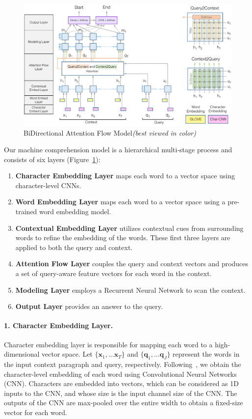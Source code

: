 
\begin{figure}[t]
\centering
\includegraphics[width=34pc]{figures/model}
\caption{\small BiDirectional Attention Flow Model\space\space \textit{(best viewed in color)}}
\label{fig:model}
\end{figure}
Our machine comprehension model is a hierarchical multi-stage process and consists of six layers (Figure~\ref{fig:model}): 
\begin{enumerate}
    \item \textbf{Character Embedding Layer} maps each word to a vector space using character-level CNNs. %
    \item \textbf{Word Embedding Layer} maps each word to a vector space using a pre-trained word embedding model. %
    \item \textbf{Contextual Embedding Layer} utilizes contextual cues from surrounding words to refine the embedding of the words. %
    These first three layers are applied to both the query and context.
    \item \textbf{Attention Flow Layer} %
    couples the query and context vectors and produces a set of query-aware feature vectors for each word in the context.
    \item \textbf{Modeling Layer} employs a Recurrent Neural Network to scan the context.%
    \item \textbf{Output Layer} provides an answer to the query.%
\end{enumerate}

\paragraph{1. Character Embedding Layer.}\label{subsec:char}
Character embedding layer is responsible for mapping each word to a high-dimensional vector space. Let $\{\bm{x}_1, \dots \bm{x}_T\}$ and $\{\bm{q}_1, \dots \bm{q}_J\}$ represent the words in the input context paragraph and query, respectively.
Following~\cite{char-cnn}, we obtain the character-level embedding of each word using Convolutional Neural Networks (CNN). Characters are embedded into vectors, which can be considered as 1D inputs to the CNN, and whose size is the input channel size of the CNN. The outputs of the CNN are max-pooled over the entire width to obtain a fixed-size vector for each word.  

